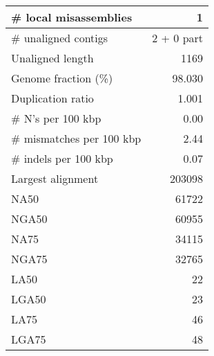 \documentclass[12pt,a4paper]{article}
\begin{document}
\begin{table}[ht]
\begin{center}
\begin{tabular}{|l*{1}{|r}|}
\# local misassemblies & 1 \\ \hline
\# unaligned contigs & 2 + 0 part \\ \hline
Unaligned length & 1169 \\ \hline
Genome fraction (\%) & 98.030 \\ \hline
Duplication ratio & 1.001 \\ \hline
\# N's per 100 kbp & 0.00 \\ \hline
\# mismatches per 100 kbp & 2.44 \\ \hline
\# indels per 100 kbp & 0.07 \\ \hline
Largest alignment & 203098 \\ \hline
NA50 & 61722 \\ \hline
NGA50 & 60955 \\ \hline
NA75 & 34115 \\ \hline
NGA75 & 32765 \\ \hline
LA50 & 22 \\ \hline
LGA50 & 23 \\ \hline
LA75 & 46 \\ \hline
LGA75 & 48 \\ \hline
\end{tabular}
\end{center}
\end{table}
\end{document}
